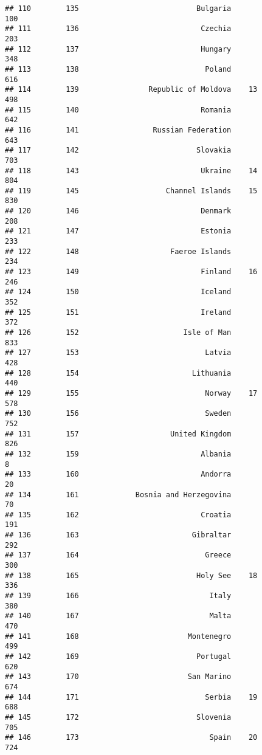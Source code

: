 \documentclass[]{article}
\begin{document}
\begin{verbatim}
## 110        135                           Bulgaria                100
## 111        136                            Czechia                203
## 112        137                            Hungary                348
## 113        138                             Poland                616
## 114        139                Republic of Moldova    13          498
## 115        140                            Romania                642
## 116        141                 Russian Federation                643
## 117        142                           Slovakia                703
## 118        143                            Ukraine    14          804
## 119        145                    Channel Islands    15          830
## 120        146                            Denmark                208
## 121        147                            Estonia                233
## 122        148                     Faeroe Islands                234
## 123        149                            Finland    16          246
## 124        150                            Iceland                352
## 125        151                            Ireland                372
## 126        152                        Isle of Man                833
## 127        153                             Latvia                428
## 128        154                          Lithuania                440
## 129        155                             Norway    17          578
## 130        156                             Sweden                752
## 131        157                     United Kingdom                826
## 132        159                            Albania                  8
## 133        160                            Andorra                 20
## 134        161             Bosnia and Herzegovina                 70
## 135        162                            Croatia                191
## 136        163                          Gibraltar                292
## 137        164                             Greece                300
## 138        165                           Holy See    18          336
## 139        166                              Italy                380
## 140        167                              Malta                470
## 141        168                         Montenegro                499
## 142        169                           Portugal                620
## 143        170                         San Marino                674
## 144        171                             Serbia    19          688
## 145        172                           Slovenia                705
## 146        173                              Spain    20          724

\end{verbatim}
\end{document}
